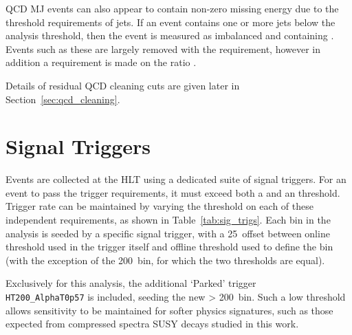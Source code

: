 QCD MJ events can also appear to contain non-zero missing energy 
due to the threshold requirements of jets. If an event contains 
one or more jets below the analysis threshold, then the 
event is measured as imbalanced and containing \mht. Events such as these are largely 
removed with the \alphat requirement, however in addition a requirement is made on the
ratio \mhtmet.

Details of residual QCD cleaning cuts are given later in
Section~\ref{sec:qcd_cleaning}.



\section{Signal Triggers}
\label{sec:signal_triggers}

Events are collected at the HLT using a dedicated suite of
signal triggers. For an event to pass the trigger
requirements, it must exceed both a \HT and an \alphat threshold. Trigger rate 
can be maintained by varying the
threshold on each of these independent requirements, as shown in
Table~\ref{tab:sig_trigs}. Each \HT bin in the analysis is seeded by a
specific signal
trigger, with a 25~\gev offset between online \HT threshold used in the trigger itself
and offline \HT threshold used to define the \HT bin (with the
exception of the 200~\gev bin, for which the two thresholds are equal).

Exclusively for this analysis, the additional `Parked' trigger 
\\\verb!HT200_AlphaT0p57! is included, seeding the new \HT> 200~\gev bin. Such a low
threshold allows sensitivity to be maintained for softer physics signatures, such
as those expected from compressed spectra SUSY decays studied in this work.

